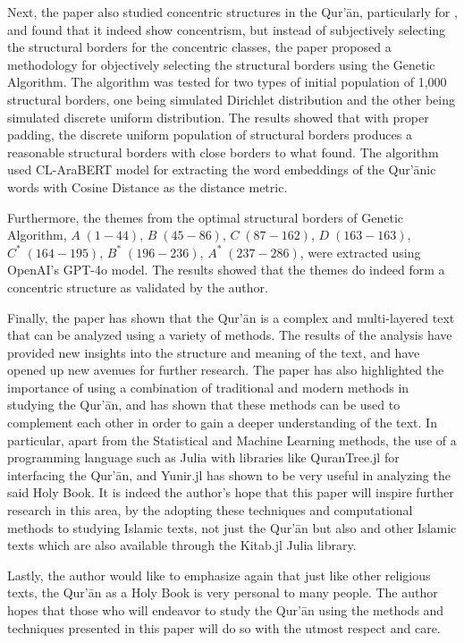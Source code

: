 Next, the paper also studied concentric structures in the Qur'\=an, particularly for  , and found that it indeed show concentrism, but instead of  subjectively selecting the structural borders for the concentric classes, the paper proposed a methodology for objectively selecting the structural borders using the Genetic Algorithm. The algorithm was tested for two types of initial population of 1,000 structural borders, one being simulated Dirichlet distribution and the other being simulated discrete uniform distribution. The results showed that with proper padding, the discrete uniform population of structural borders produces a reasonable structural borders with close borders to what  found. The algorithm used CL-AraBERT model for extracting the word embeddings of the Qur'\=anic words with Cosine Distance as the distance metric.

Furthermore, the themes from the optimal structural borders of Genetic Algorithm, $A\;(1-44)$, $B\;(45-86)$, $C\;(87-162)$, $D\;(163-163)$, $C^*\;(164-195)$, $B^*\;(196-236)$, $A^*\;(237-286)$, were extracted using OpenAI's GPT-4o model. The results showed that the themes do indeed form a concentric structure as validated by the author.

Finally, the paper has shown that the Qur'\=an is a complex and multi-layered text that can be analyzed using a variety of methods. The results of the analysis have provided new insights into the structure and meaning of the text, and have opened up new avenues for further research. The paper has also highlighted the importance of using a combination of traditional and modern methods in studying the Qur'\=an, and has shown that these methods can be used to complement each other in order to gain a deeper understanding of the text. In particular, apart from the Statistical and Machine Learning methods, the use of a programming language such as Julia with libraries like QuranTree.jl \cite{asaad2021qurantree} for interfacing the Qur'\=an, and Yunir.jl \cite{al_ahmadgaid_b_asaad_yunir} has shown to be very useful in analyzing the said Holy Book. It is indeed the author's hope that this paper will inspire further research in this area, by the adopting these techniques and computational methods to studying Islamic texts, not just the Qur'\=an but also   and other Islamic texts which are also available through the Kitab.jl \cite{al_ahmadgaid_b_asaad_kitab} Julia library.

Lastly, the author would like to emphasize again that just like other religious texts, the Qur'\=an as a Holy Book is very personal to many people. The author hopes that those who will endeavor to study the Qur'\=an using the methods and techniques presented in this paper will do so with the utmost respect and care. 